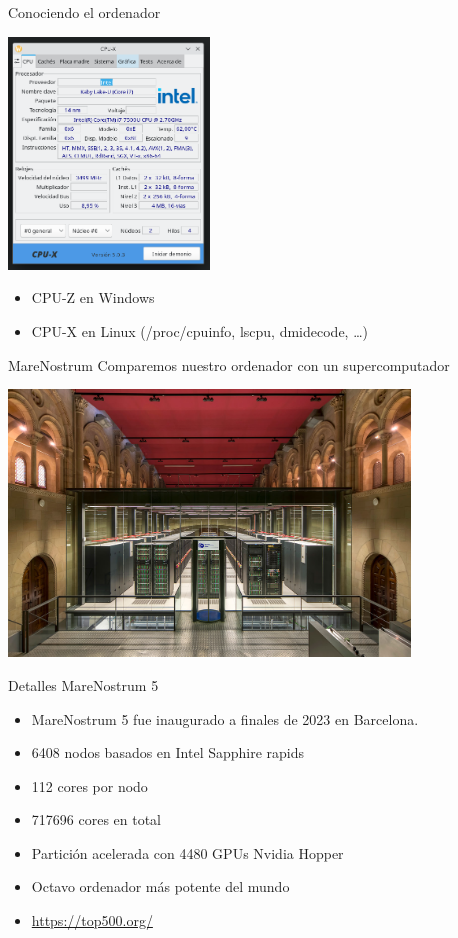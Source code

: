 \documentclass[bigger]{beamer}
\begin{document}
\begin{frame}[label={sec:orgd30b290}]{Conociendo el ordenador}
\begin{center}
\includegraphics[width=0.4\textwidth]{./CPUX.png}
\end{center}

\begin{itemize}
\item CPU-Z en Windows
\item CPU-X en Linux (/proc/cpuinfo, lscpu, dmidecode, \ldots{})
\end{itemize}
\end{frame}

\begin{frame}[label={sec:orgc0d9366}]{MareNostrum}
Comparemos nuestro ordenador con un supercomputador

\begin{center}
\includegraphics[width=0.8\textwidth]{./MareNostrum.jpg}
\end{center}
\end{frame}

\begin{frame}[label={sec:org1fef556}]{Detalles MareNostrum 5}
\begin{itemize}
\item MareNostrum 5 fue inaugurado a finales de 2023 en Barcelona.
\item 6408 nodos basados en Intel Sapphire rapids
\item 112 cores por nodo
\item 717696 cores en total
\item Partición acelerada con 4480 GPUs Nvidia Hopper
\item Octavo ordenador más potente del mundo
\item \url{https://top500.org/}
\end{itemize}
\end{frame}
\end{document}

